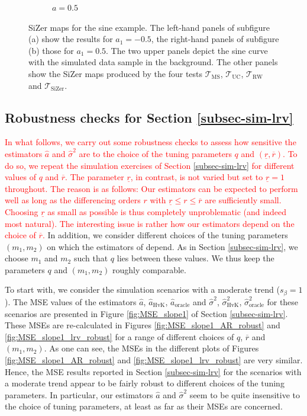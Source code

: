 \begin{figure}[p]
\begin{subfigure}[b]{0.475\textwidth}
\caption{$a=0.5$}
\end{subfigure}
\caption{SiZer maps for the sine example. The left-hand panels of subfigure (a) show the results for $a_1=-0.5$, the right-hand panels of subfigure (b) those for $a_1=0.5$. The two upper panels depict the sine curve with the simulated data sample in the background. The other panels show the SiZer maps produced by the four tests $\mathcal{T}_{\text{MS}}$, $\mathcal{T}_{\text{UC}}$, $\mathcal{T}_{\text{RW}}$ and $\mathcal{T}_{\text{SiZer}}$.}\label{fig:sizer:sine}
\end{figure}  


\newpage
\subsection*{Robustness checks for Section \ref{subsec-sim-lrv}}


\textcolor{red}{In what follows, we carry out some robustness checks to assess how sensitive the estimators $\widehat{a}$ and $\widehat{\sigma}^2$ are to the choice of the tuning parameters $q$ and $(\underline{r},\overline{r})$. To do so, we repeat the simulation exercises of Section \ref{subsec-sim-lrv} for different values of $q$ and $\overline{r}$. The parameter $\underline{r}$, in contrast, is not varied but set to $\underline{r}=1$ throughout. The reason is as follows: Our estimators can be expected to perform well as long as the differencing orders $r$ with $\underline{r} \le r \le \overline{r}$ are sufficiently small. Choosing $\underline{r}$ as small as possible is thus completely unproblematic (and indeed most natural). The interesting issue is rather how our estimators depend on the choice of $\overline{r}$.}
In addition, we consider different choices of the tuning parameters $(m_1,m_2)$ on which the estimators of \cite{Hall2003} depend. As in Section \ref{subsec-sim-lrv}, we choose $m_1$ and $m_2$ such that $q$ lies between these values. We thus keep the parameters $q$ and $(m_1,m_2)$ roughly comparable. 


To start with, we consider the simulation scenarios with a moderate trend ($s_\beta = 1$). The MSE values of the estimators $\widehat{a}$, $\widehat{a}_{\text{HvK}}$, $\widehat{a}_{\text{oracle}}$ and $\widehat{\sigma}^2$, $\widehat{\sigma}^2_{\text{HvK}}$, $\widehat{\sigma}^2_{\text{oracle}}$ for these scenarios are presented in Figure \ref{fig:MSE_slope1} of Section \ref{subsec-sim-lrv}. These MSEs are re-calculated in Figures \ref{fig:MSE_slope1_AR_robust} and \ref{fig:MSE_slope1_lrv_robust} for a range of different choices of $q$, $\overline{r}$ and $(m_1,m_2)$. As one can see, the MSEs in the different plots of Figures \ref{fig:MSE_slope1_AR_robust} and \ref{fig:MSE_slope1_lrv_robust} are very similar. Hence, the MSE results reported in Section \ref{subsec-sim-lrv} for the scenarios with a moderate trend appear to be fairly robust to different choices of the tuning parameters. In particular, our estimators $\widehat{a}$ and $\widehat{\sigma}^2$ seem to be quite insensitive to the choice of tuning parameters, at least as far as their MSEs are concerned.



